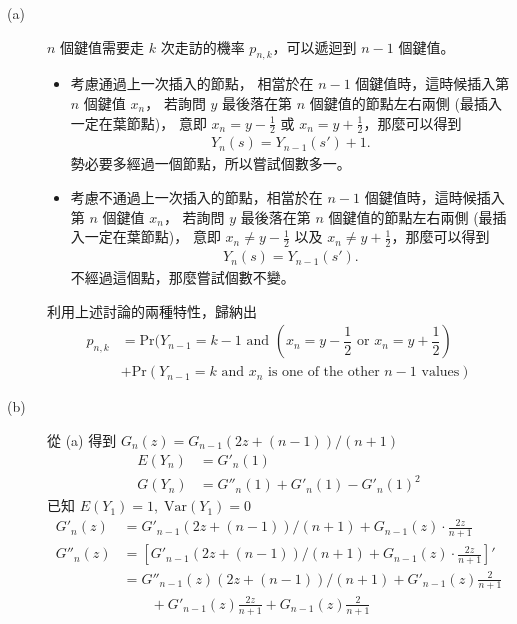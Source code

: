 \documentclass[11pt,fleqn]{article}
\begin{document}
\begin{description}
	\item[(a)] $n$ 個鍵值需要走 $k$ 次走訪的機率 $p_{n,k}$，可以遞迴到 $n-1$ 個鍵值。
		\begin{itemize}
			\item 考慮通過上一次插入的節點，
				相當於在 $n-1$ 個鍵值時，這時候插入第 $n$ 個鍵值 $x_n$，
				若詢問 $y$ 最後落在第 $n$ 個鍵值的節點左右兩側 (最插入一定在葉節點)，
				意即 $x_n = y - \frac{1}{2}$ 或 $x_n = y + \frac{1}{2}$，那麼可以得到 
				\begin{align*}
					Y_n(s) = Y_{n-1}(s') + 1.
				\end{align*}
				勢必要多經過一個節點，所以嘗試個數多一。
			\item 考慮不通過上一次插入的節點，相當於在 $n-1$ 個鍵值時，這時候插入第 $n$ 個鍵值 $x_n$，
				若詢問 $y$ 最後落在第 $n$ 個鍵值的節點左右兩側 (最插入一定在葉節點)，
				意即 $x_n \neq y - \frac{1}{2}$ 以及 $x_n \neq y + \frac{1}{2}$，那麼可以得到 
				\begin{align*}
					Y_n(s) = Y_{n-1}(s').
				\end{align*}
				不經過這個點，那麼嘗試個數不變。
		\end{itemize}
		利用上述討論的兩種特性，歸納出
		\begin{align*}
			p_{n,k} &= \text{Pr}(Y_{n-1} = k-1 \text{ and } (x_n = y - \dfrac{1}{2} \text{ or } x_n = y + \dfrac{1}{2}) \\
					& + \text{Pr}(Y_{n-1} = k \text{ and } x_n \text{ is one of the other } n-1 \text{ values}) 
		\end{align*}
	\item[(b)] 從 (a) 得到 $G_n(z) = G_{n-1} (2 z + (n-1)) / (n+1)$
		\begin{align*}
			E(Y_n) &= {G}'_n(1) \\
			G(Y_n) &= {G}''_n(1) + {G}'_n(1) - {G}'_n(1)^2
		\end{align*}
		已知 $E(Y_1) = 1, \; \text{Var}(Y_1) = 0$
		\begin{align*}
			{G}'_n(z) &= {G}'_{n-1} (2z + (n-1)) / (n+1) + G_{n-1}(z) \cdot \frac{2z}{n+1} \\
			{G}''_n(z) &= \left[ {G}'_{n-1} (2z + (n-1)) / (n+1) + G_{n-1}(z) \cdot \frac{2z}{n+1} \right]' \\
				&= {G}''_{n-1}(z)(2z + (n-1)) / (n+1) + {G}'_{n-1}(z) \frac{2}{n+1} \\
				& \qquad + {G}'_{n-1}(z)\frac{2z}{n+1} + G_{n-1}(z) \frac{2}{n+1} \\
		\end{align*}

\end{description}
\end{document}
